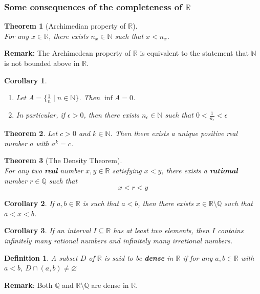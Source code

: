\documentclass[8pt]{article}
\newtheorem{definition}{Definition}[section]
\newtheorem{theorem}{Theorem}[section]
\newtheorem{corollary}{Corollary}[section]
\theoremstyle{definition}
\begin{document}
\subsubsection{Some consequences of the completeness of $\mathbb{R}$}
\begin{theorem}[Archimedian property of $\mathbb{R}$]\hfill\\\normalfont
For any $x\in\mathbb{R}$, there exists $n_x\in\mathbb{N}$ such that $x<n_x$.
\end{theorem}
\textbf{Remark:} The Archimedean property of $\mathbb{R}$ is equivalent to the statement that $\mathbb{N}$ is not bounded above in $\mathbb{R}$.
\begin{corollary}\hfill
\normalfont\begin{enumerate}
\item Let $A=\{\frac{1}{n}\mid n\in\mathbb{N}\}$. Then $\inf A=0$.
\item In particular, if $\epsilon>0$, then there exists $n_\epsilon\in\mathbb{N}$ such that $0<\frac{1}{n_\epsilon}<\epsilon$
\end{enumerate}
\end{corollary}
\begin{theorem}\normalfont Let $c>0$ and $k\in\mathbb{N}$. Then there exists a unique positive real number $a$ with $a^k=c$.
\end{theorem}
\begin{theorem}[The Density Theorem]
\hfill\\
\normalfont For any two \textbf{real} number $x,y\in\mathbb{R}$ satisfying $x<y$, there exists a \textbf{rational} number $r\in\mathbb{Q}$ such that
\[
x<r<y
\]
\end{theorem}
\begin{corollary}\normalfont If $a,b\in\mathbb{R}$ is such that $a<b$, then there exists $x\in\mathbb{R}\setminus\mathbb{Q}$ such that $a<x<b$.
\end{corollary}
\begin{corollary}\normalfont If an interval $I\subseteq \mathbb{R}$ has at least two elements, then $I$ contains infinitely many rational numbers and infinitely many irrational numbers. 
\end{corollary}
\begin{definition}\normalfont A subset $D$ of $\mathbb{R}$ is said to be \textbf{dense} in $\mathbb{R}$ if for any $a,b\in\mathbb{R}$ with $a<b$, $D\cap(a,b)\neq\varnothing$
\end{definition}
\textbf{Remark}: Both $\mathbb{Q}$ and $\mathbb{R}\setminus\mathbb{Q}$ are dense in $\mathbb{R}$.
\end{document}
